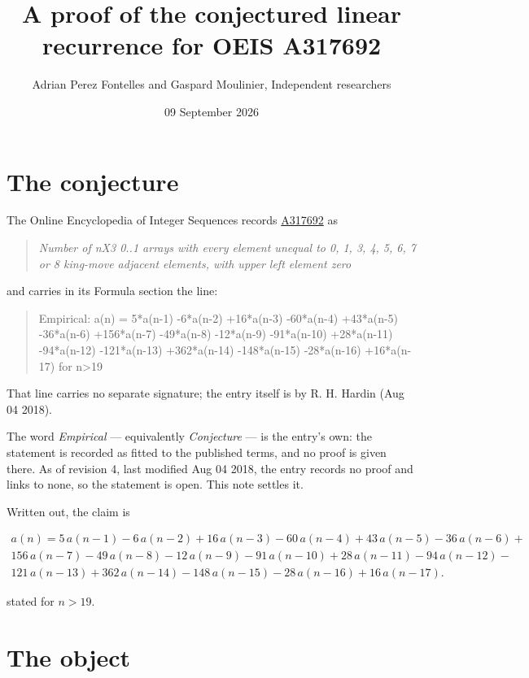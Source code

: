\documentclass[11pt]{article}
\title{A proof of the conjectured linear recurrence for OEIS A317692}
\author{Adrian Perez Fontelles and Gaspard Moulinier, Independent researchers}
\date{09 September 2026}
\theoremstyle{definition}
\begin{document}
\maketitle
\section{The conjecture}

The Online Encyclopedia of Integer Sequences records \href{https://oeis.org/A317692}{A317692} as

\begin{quote}\itshape Number of nX3 0..1 arrays with every element unequal to 0, 1, 3, 4, 5, 6, 7 or 8 king-move adjacent elements, with upper left element zero\end{quote}

and carries in its Formula section the line:

\begin{quote}\ttfamily Empirical: a(n) = 5*a(n-1) -6*a(n-2) +16*a(n-3) -60*a(n-4) +43*a(n-5) -36*a(n-6) +156*a(n-7) -49*a(n-8) -12*a(n-9) -91*a(n-10) +28*a(n-11) -94*a(n-12) -121*a(n-13) +362*a(n-14) -148*a(n-15) -28*a(n-16) +16*a(n-17) for n>19\end{quote}

That line carries no separate signature; the entry itself is by R. H. Hardin (Aug 04 2018).

The word {\itshape Empirical} --- equivalently {\itshape Conjecture} --- is the entry's own: the statement is recorded as fitted to the published terms, and no proof is given there. As of revision 4, last modified Aug 04 2018, the entry records no proof and links to none, so the statement is open. This note settles it.

Written out, the claim is

\begin{multline*} a(n) = 5\,a(n-1) - 6\,a(n-2) + 16\,a(n-3) - 60\,a(n-4) + 43\,a(n-5) - 36\,a(n-6) + \\ 156\,a(n-7) - 49\,a(n-8) - 12\,a(n-9) - 91\,a(n-10) + 28\,a(n-11) - 94\,a(n-12) - \\ 121\,a(n-13) + 362\,a(n-14) - 148\,a(n-15) - 28\,a(n-16) + 16\,a(n-17). \end{multline*}

stated for $n > 19$.

\section{The object}
\end{document}
